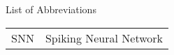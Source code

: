 \clearemptydoublepage

{}

\begin{center}
	\huge{List of Abbreviations}
\end{center}


\vspace{3cm}


\begin{center}
\begin{tabular}{l p{12cm}}
	SNN & Spiking Neural Network\\	
\end{tabular}
\end{center}
